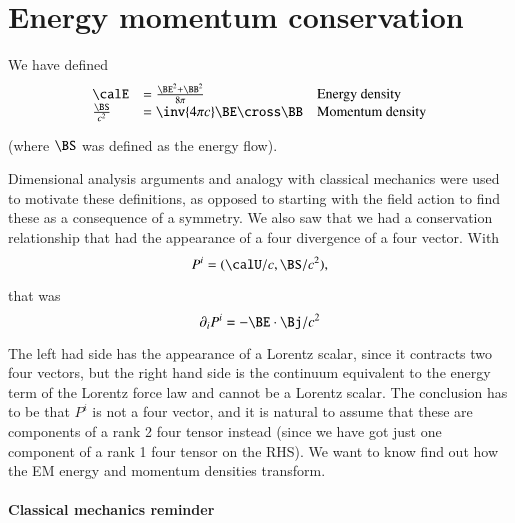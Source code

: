 %
%
\section{Energy momentum conservation}

We have defined
%
\begin{equation}\label{eqn:relativisticElectrodynamicsL21b:320}
\begin{array}{l l l}
\calE &= \frac{\BE^2 + \BB^2}{8\pi} & \mbox{Energy density} \\
\frac{\BS}{c^2} &= \inv{4 \pi c} \BE \cross \BB & \mbox{Momentum density}
\end{array}
\end{equation}

(where \(\BS\) was defined as the energy flow).

Dimensional analysis arguments and analogy with classical mechanics were used to motivate these definitions, as opposed to starting with the field action to find these as a consequence of a symmetry.  We also saw that we had a conservation relationship that had the appearance of a four divergence of a four vector.  With
%
\begin{equation}\label{eqn:relativisticElectrodynamicsL21b:340}
P^i = (\calU/c, \BS/c^2),
\end{equation}

that was
%
\begin{equation}\label{eqn:relativisticElectrodynamicsL21b:360}
\partial_i P^i = - \BE \cdot \Bj/c^2
\end{equation}

The left had side has the appearance of a Lorentz scalar, since it contracts two four vectors, but the right hand side is the continuum equivalent to the energy term of the Lorentz force law and cannot be a Lorentz scalar.  The conclusion has to be that \(P^i\) is not a four vector, and it is natural to assume that these are components of a rank 2 four tensor instead (since we have got just one component of a rank 1 four tensor on the RHS).  We want to know find out how the EM energy and momentum densities transform.

\paragraph{Classical mechanics reminder}

